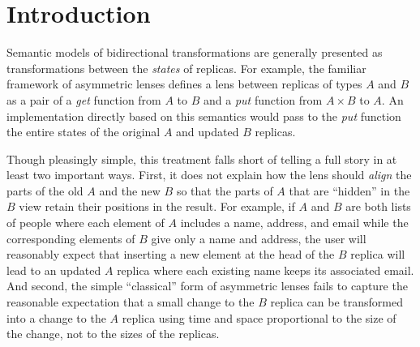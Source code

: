 \section{Introduction}

\iflater
{}

\fi

Semantic models of bidirectional transformations are generally presented as
transformations between the {\em states} of replicas.  For example, the
familiar framework of asymmetric lenses defines a lens between replicas of
types $A$ and $B$ as a pair of a {\em get} function from $A$ to $B$ and a
{\em put} function from $A \times B$ to $A$.
%
An implementation directly based on this semantics would pass to the {\em
  put} function the entire states of the original $A$ and updated $B$
replicas.

Though pleasingly simple, this treatment falls short of telling a full story
in at least two important ways.
First, it does not explain how the lens should {\em align} the parts of the
old $A$ and the new $B$ so that the parts of $A$ that are ``hidden'' in the
$B$ view retain their positions in the result.  For example, if $A$ and $B$
are both lists of people where each element of $A$ includes a name, address,
and email while the corresponding elements of $B$ give only a name and
address, the user will reasonably expect that inserting a new element at the
head of the $B$ replica will lead to an updated $A$ replica where each
existing name keeps its associated email.  And second, the simple
``classical'' form of asymmetric lenses fails to capture the reasonable
expectation that a small change to the $B$ replica can be transformed into a
change to the $A$ replica using time and space proportional to the size of
the change, not to the sizes of the replicas.  


